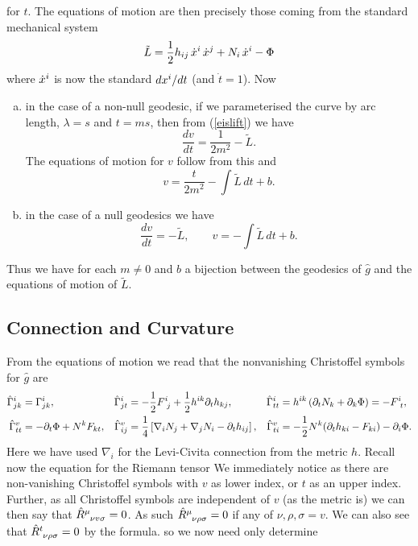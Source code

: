 \documentclass{article}
\begin{document}
for $t$. The equations of motion are then precisely those coming from the standard mechanical system
$$\tilde L= \frac12 h_{ij}\, \dot x\sp{i}\, \dot x\sp{j}+N_i \,\dot x\sp{i}-\Phi $$
where $ \dot x\sp{i}$ is now the standard $d x\sp{i}/dt$ (and $\dot t = 1$). Now
\begin{enumerate}[(a)]
	\item in the case of a non-null geodesic, if we parameterised the curve by arc length, $\lambda=s$ and $t =ms$, then from (\ref{eislift}) we have 
	$$\frac{dv}{dt}= \frac1{2m^2} -\tilde L.$$
	The equations of motion for $v$ follow from this and
	$$v=\frac{t}{2m^2}-\int \tilde L\, dt +b.$$
	\item in the case of a null geodesics we have
	$$\frac{dv}{dt}=  -\tilde L,\qquad  v=-\int \tilde L\, dt +b.$$
\end{enumerate}
Thus we have for each $m\ne0$ and $b$ a bijection between the geodesics of $\hat g$ and the
equations of motion of $\tilde L$.
\subsection{Connection and Curvature}
From the equations of motion we read that the nonvanishing Christoffel symbols for $\hat g$ are
\begin{align*}
\hat \Gamma\sp{i}_{jk}&=  \Gamma\sp{i}_{jk},
&\hat \Gamma\sp{i}_{jt}&=-\frac12 F\sp{i}_{\ j}+\frac12 h\sp{ik}\partial_t h_{kj},
&\hat \Gamma\sp{i}_{tt}&=h\sp{ik} \left( \partial_t N_k +\partial_{k} \Phi \right)= -F\sp{i}_{\ t},
\\
\hat \Gamma\sp{v}_{tt}&=-\partial_t \Phi+N\sp{k}F_{kt}, 
&\hat \Gamma\sp{v}_{ij}&=\frac14\left[\nabla_{i}N_{j}+\nabla_{j}N_{i}-\partial_t h_{ij}\right],
&\hat \Gamma\sp{v}_{ti}&=-\frac12 N\sp{k} (\partial_t h_{ki} -F_{ki}) -\partial_i\Phi .
\end{align*}
Here we have used $\nabla_i$ for the Levi-Civita connection from the metric $h$. Recall now the equation for the Riemann tensor 
We immediately notice 
as there are non-vanishing Christoffel symbols with $v$ as lower index, or $t$ as an upper index. \\
Further, as all Christoffel symbols are independent of $v$ (as the metric is) we can then say that $\hat{R}\indices{^\mu_\nu_v_\sigma} = 0$. As such $\hat{R}\indices{^\mu_\nu_\rho_\sigma}=0$ if any of $\nu,\rho,\sigma=v$. We can also see that $\hat{R}\indices{^t_\nu_\rho_\sigma}=0$ by the formula. so we now need only determine
\end{document}
